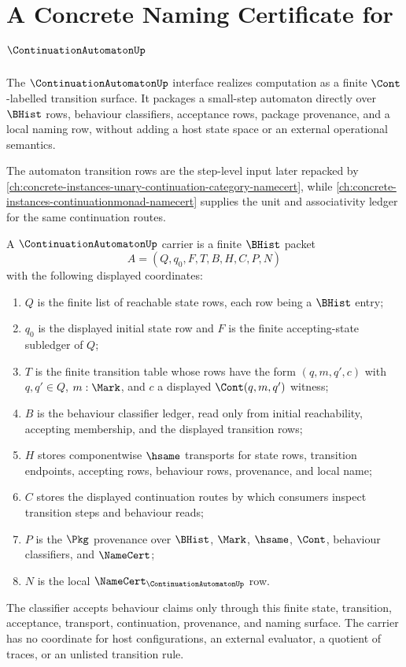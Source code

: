 \chapter{A Concrete Naming Certificate for $\ContinuationAutomatonUp$}
\label{ch:concrete-instances-continuationautomaton-namecert}

The $\ContinuationAutomatonUp$ interface realizes computation as a finite $\Cont$-labelled transition surface. It packages a small-step automaton directly over $\BHist$ rows, behaviour classifiers, acceptance rows, package provenance, and a local naming row, without adding a host state space or an external operational semantics.

The automaton transition rows are the step-level input later repacked by \autoref{ch:concrete-instances-unary-continuation-category-namecert}, while \autoref{ch:concrete-instances-continuationmonad-namecert} supplies the unit and associativity ledger for the same continuation routes.

\begin{definition}\label{def:continuationautomaton-carrier}
A $\ContinuationAutomatonUp$ carrier is a finite $\BHist$ packet
$$
A=(Q,q_0,F,T,B,H,C,P,N)
$$
with the following displayed coordinates:
\begin{enumerate}
\item $Q$ is the finite list of reachable state rows, each row being a $\BHist$ entry;
\item $q_0$ is the displayed initial state row and $F$ is the finite accepting-state subledger of $Q$;
\item $T$ is the finite transition table whose rows have the form $(q,m,q',c)$ with $q,q'\in Q$, $m:\Mark$, and $c$ a displayed $\Cont(q,m,q')$ witness;
\item $B$ is the behaviour classifier ledger, read only from initial reachability, accepting membership, and the displayed transition rows;
\item $H$ stores componentwise $\hsame$ transports for state rows, transition endpoints, accepting rows, behaviour rows, provenance, and local name;
\item $C$ stores the displayed continuation routes by which consumers inspect transition steps and behaviour reads;
\item $P$ is the $\Pkg$ provenance over $\BHist$, $\Mark$, $\hsame$, $\Cont$, behaviour classifiers, and $\NameCert$;
\item $N$ is the local $\NameCert_{\ContinuationAutomatonUp}$ row.
\end{enumerate}
The classifier accepts behaviour claims only through this finite state, transition, acceptance, transport, continuation, provenance, and naming surface. The carrier has no coordinate for host configurations, an external evaluator, a quotient of traces, or an unlisted transition rule.
\end{definition}

